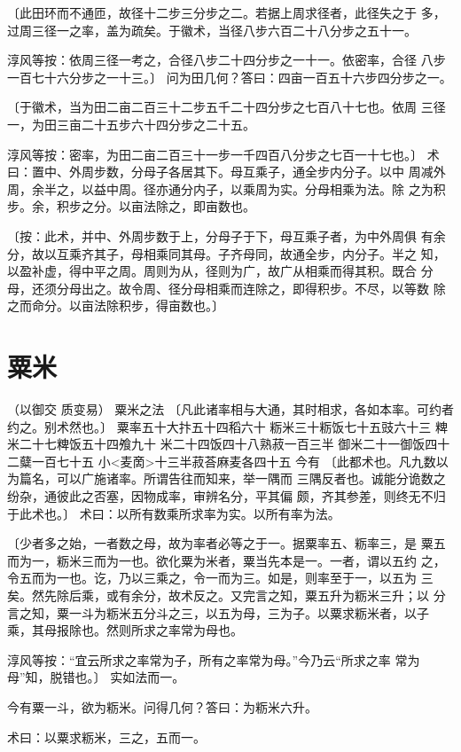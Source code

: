 \documentclass[a4paper,12pt,UTF8,twoside]{ctexbook}
\begin{document}
〔此田环而不通匝，故径十二步三分步之二。若据上周求径者，此径失之于 多，过周三径一之率，盖为疏矣。于徽术，当径八步六百二十八分步之五十一。

淳风等按：依周三径一考之，合径八步二十四分步之一十一。依密率，合径 八步一百七十六分步之一十三。〕 问为田几何？答曰：四亩一百五十六步四分步之一。

〔于徽术，当为田二亩二百三十二步五千二十四分步之七百八十七也。依周 三径一，为田三亩二十五步六十四分步之二十五。

淳风等按：密率，为田二亩二百三十一步一千四百八分步之七百一十七也。〕 术曰：置中、外周步数，分母子各居其下。母互乘子，通全步内分子。以中 周减外周，余半之，以益中周。径亦通分内子，以乘周为实。分母相乘为法。除 之为积步。余，积步之分。以亩法除之，即亩数也。

〔按：此术，并中、外周步数于上，分母子于下，母互乘子者，为中外周俱 有余分，故以互乘齐其子，母相乘同其母。子齐母同，故通全步，内分子。半之 知，以盈补虚，得中平之周。周则为从，径则为广，故广从相乘而得其积。既合 分母，还须分母出之。故令周、径分母相乘而连除之，即得积步。不尽，以等数 除之而命分。以亩法除积步，得亩数也。〕 

\chapter{粟米}
（以御交 质变易） 粟米之法 〔凡此诸率相与大通，其时相求，各如本率。可约者约之。别术然也。〕 粟率五十大抃五十四稻六十 粝米三十粝饭七十五豉六十三 粺米二十七粺饭五十四飧九十 米二十四饭四十八熟菽一百三半 御米二十一御饭四十二糵一百七十五 小<麦啇>十三半菽荅麻麦各四十五 今有 〔此都术也。凡九数以为篇名，可以广施诸率。所谓告往而知来，举一隅而 三隅反者也。诚能分诡数之纷杂，通彼此之否塞，因物成率，审辨名分，平其偏 颇，齐其参差，则终无不归于此术也。〕 术曰：以所有数乘所求率为实。以所有率为法。

〔少者多之始，一者数之母，故为率者必等之于一。据粟率五、粝率三，是 粟五而为一，粝米三而为一也。欲化粟为米者，粟当先本是一。一者，谓以五约 之，令五而为一也。讫，乃以三乘之，令一而为三。如是，则率至于一，以五为 三矣。然先除后乘，或有余分，故术反之。又完言之知，粟五升为粝米三升；以 分言之知，粟一斗为粝米五分斗之三，以五为母，三为子。以粟求粝米者，以子 乘，其母报除也。然则所求之率常为母也。

淳风等按：“宜云所求之率常为子，所有之率常为母。”今乃云“所求之率 常为母”知，脱错也。〕 实如法而一。

今有粟一斗，欲为粝米。问得几何？答曰：为粝米六升。

术曰：以粟求粝米，三之，五而一。
\end{document}
